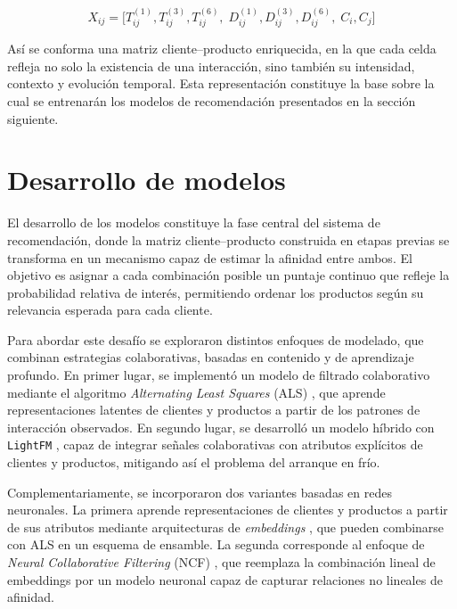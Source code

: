 \begin{equation}
\label{eq:feature_vector}
X_{ij} = \big[ T_{ij}^{(1)}, T_{ij}^{(3)}, T_{ij}^{(6)}, \; D_{ij}^{(1)}, D_{ij}^{(3)}, D_{ij}^{(6)}, \; C_{i}, C_{j} \big]
\end{equation}

Así se conforma una matriz cliente–producto enriquecida, en la que cada celda refleja no solo la existencia de una interacción, sino también su intensidad, contexto y evolución temporal. Esta representación constituye la base sobre la cual se entrenarán los modelos de recomendación presentados en la sección siguiente.


\section{Desarrollo de modelos}

El desarrollo de los modelos constituye la fase central del sistema de recomendación, donde la matriz cliente–producto construida en etapas previas se transforma en un mecanismo capaz de estimar la afinidad entre ambos. El objetivo es asignar a cada combinación posible un puntaje continuo que refleje la probabilidad relativa de interés, permitiendo ordenar los productos según su relevancia esperada para cada cliente.

Para abordar este desafío se exploraron distintos enfoques de modelado, que combinan estrategias colaborativas, basadas en contenido y de aprendizaje profundo. En primer lugar, se implementó un modelo de filtrado colaborativo mediante el algoritmo \textit{Alternating Least Squares} (ALS) \cite{ARTICLE:ALS2008, ARTICLE:Hu2008}, que aprende representaciones latentes de clientes y productos a partir de los patrones de interacción observados. En segundo lugar, se desarrolló un modelo híbrido con \texttt{LightFM} \cite{ARTICLE:LightFM2015}, capaz de integrar señales colaborativas con atributos explícitos de clientes y productos, mitigando así el problema del arranque en frío.

Complementariamente, se incorporaron dos variantes basadas en redes neuronales. La primera aprende representaciones de clientes y productos a partir de sus atributos mediante arquitecturas de \textit{embeddings} \cite{ARTICLE:Grbovic2018}, que pueden combinarse con ALS en un esquema de ensamble. La segunda corresponde al enfoque de \textit{Neural Collaborative Filtering} (NCF) \cite{ARTICLE:He2017}, que reemplaza la combinación lineal de embeddings por un modelo neuronal capaz de capturar relaciones no lineales de afinidad.

